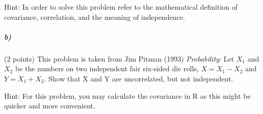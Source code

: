 \documentclass[12pt,letter]{article}
\begin{document}
Hint: In order to solve this problem refer to the mathematical definition of covariance, correlation, and the meaning of independence.

\subparagraph{b)} (2 points) This problem is taken from Jim Pitman (1993) \textit{Probability}: Let $X_{1}$ and $X_{2} $ be the numbers on two independent fair six-sided die rolls, $X = X_{1} - X_{2}$ and $Y= X_{1} + X_{2}$. Show that X and Y are uncorrelated, but not independent. %

Hint: For this problem, you may calculate the covariance in R as this might be quicker and more convenient.
\end{document}

